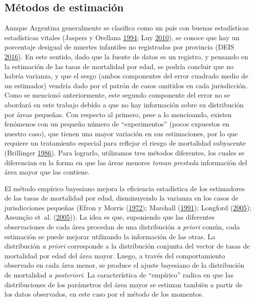 \documentclass[12pt,spanish,]{article}
\begin{document}
\hypertarget{muxe9todos-de-estimaciuxf3n}{%
\subsection{Métodos de estimación}\label{muxe9todos-de-estimaciuxf3n}}

Aunque Argentina generalmente se clasifica como un país con buenas
estadísticas estadísticas vitales (Jaspers y Orellana
\protect\hyperlink{ref-JaspersOrellana1994}{1994}; Luy
\protect\hyperlink{ref-Luy2010}{2010}), se conoce que hay un porcentaje
desigual de muertes infantiles no registradas por provincia (DEIS
\protect\hyperlink{ref-DEIS2016}{2016}). En este sentido, dado que la
fuente de datos es un registro, y pensando en la estimación de las tasas
de mortalidad por edad, se podría concluir que no habría varianza, y que
el sesgo (ambos componentes del error cuadrado medio de un estimador)
vendría dado por el patrón de casos omitidos en cada jurisdicción. Como
se mencionó anteriormente, este segundo componente del error no se
abordará en este trabajo debido a que no hay información sobre su
distribución por áreas pequeñas. Con respecto al primero, pese a lo
mencioando, existen fenómenos con un pequeño número de ``experimentos''
(pocos expuestos en nuestro caso), que tienen una mayor variación en sus
estimaciones, por lo que requiere un tratamiento especial para reflejar
el riesgo de mortalidad subyacente (Brillinger
\protect\hyperlink{ref-Brillinger1986}{1986}). Para lograrlo, utilizamos
tres métodos diferentes, los cuales se diferencian en la forma en que
las áreas menores \emph{toman prestada} información del área mayor que
las contiene.

El método empírico bayesiano mejora la eficiencia estadística de los
estimadores de las tasas de mortalidad por edad, disminuyendo la
varianza en los casos de jurisdicciones pequeñas (Efron y Morris
(\protect\hyperlink{ref-Efron1972}{1972}); Marshall
(\protect\hyperlink{ref-Marshall1991}{1991}); Longford
(\protect\hyperlink{ref-Longford2005}{2005}); Assunção et~al.
(\protect\hyperlink{ref-Assuncao2005}{2005})). La idea es que,
suponiendo que las diferentes observaciones de cada área procedan de una
distribución \emph{a priori} común, cada estimación se puede mejorar
utilizando la información de las otras. La distribución \emph{a priori}
corresponde a la distribución conjunta del vector de tasas de mortalidad
por edad del área mayor. Luego, a través del comportamiento observado en
cada área menor, se produce el ajuste bayesiano de la distribución de
mortalidad \emph{a posteriori}. La característica de ``empírico'' radica
en que las distribuciones de los parámetros del área mayor se estiman
también a partir de los datos observados, en este caso por el método de
los momentos.
\end{document}
